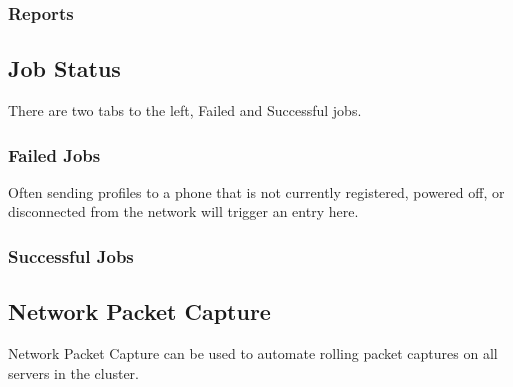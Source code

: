 \documentclass[letterpaper,10pt,english]{sphinxmanual}
\begin{document}
\subsubsection{Reports}
\label{\detokenize{webui:reports}}\begin{quote}

\end{quote}


\subsection{Job Status}
\label{\detokenize{webui:job-status}}\label{\detokenize{webui:diagnostics-job-status}}
There are two tabs to the left, Failed and Successful jobs.


\subsubsection{Failed Jobs}
\label{\detokenize{webui:failed-jobs}}
Often sending profiles to a phone that is not currently registered, powered off, or disconnected from the network will trigger an entry here.
\begin{quote}

\end{quote}


\subsubsection{Successful Jobs}
\label{\detokenize{webui:successful-jobs}}\begin{quote}

\end{quote}


\subsection{Network Packet Capture}
\label{\detokenize{webui:network-packet-capture}}\label{\detokenize{webui:diagnostics-network-packet-capture}}
Network Packet Capture can be used to automate rolling packet captures on all servers in the cluster.
\end{document}
